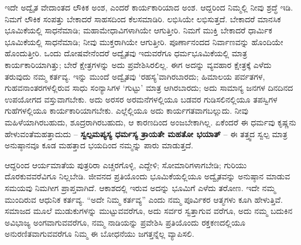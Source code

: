 ಇದೇ ಅದ್ವೈತ ವೇದಾಂತದ ಲೌಕಿಕ ಅಂಶ, ಎಂದರೆ ಕಾರ್ಯಕಾರಿಯಾದ ಅಂಶ. ಆದ್ದರಿಂದ ನಿಮ್ಮಲ್ಲಿ ನೀವು ಶ್ರದ್ಧೆ ಇಡಿ. ನಿಮಗೆ ಲೌಕಿಕ ಸಂಪತ್ತು ಬೇಕಾದರೆ ಸಾಹಸದಿಂದ ಕೆಲಸಮಾಡಿರಿ. ಲಭಿಸಿಯೇ ಲಭಿಸುತ್ತದೆ. ಬೇಕಾದರೆ ಮಾನಸಿಕ ಭೂಮಿಕೆಯಲ್ಲಿ ಸಾಧನೆಮಾಡಿ; ಮಹಾಮೇಧಾವಿಗಳಾಗಿಯೇ ಆಗುತ್ತೀರಿ. ನಿಮಗೆ ಮುಕ್ತಿ ಬೇಕಾದರೆ ಧಾರ್ಮಿಕ ಭೂಮಿಕೆಯಲ್ಲಿ ಸಾಧನೆಮಾಡಿ; ನೀವು ಮುಕ್ತರಾಗಿಯೇ ಆಗುತ್ತೀರಿ. ಪೂರ್ಣಾನಂದದ ನಿರ್ವಾಣವನ್ನು ಹೊಂದಿಯೇ ಹೊಂದುತ್ತೀರಿ. ಒಂದು ದೋಷವೇನೆಂದರೆ ಅದ್ವೈತವು ಇದುವರೆಗೂ ಧರ್ಮಭೂಮಿಕೆಯಲ್ಲಿ ಮಾತ್ರ ಕಾರ್ಯಕಾರಿಯಾಗಿತ್ತು; ಬೇರೆ ಕ್ಷೇತ್ರಗಳನ್ನು ಅದು ಪ್ರವೇಶಿಸಿರಲಿಲ್ಲ. ಈಗ ಅದನ್ನು ವ್ಯವಹಾರ ಕ್ಷೇತ್ರಕ್ಕೆ ಎಳೆದು ತರುವುದು ನಮ್ಮ ಕರ್ತವ್ಯ. ಇನ್ನು ಮುಂದೆ ಅದ್ವೈತವು ‘ರಹಸ್ಯ’ವಾಗಿರಬಾರದು; ಹಿಮಾಲಯ ಪರ್ವತಗಳ, ಗುಹವನಾಂತರಗಳಲ್ಲಿರುವ ಸಾಧು ಸಂನ್ಯಾಸಿಗಳ ‘ಗುಟ್ಟು’ ಮಾತ್ರ ಆಗಿರಬಾರದು; ಅದು ಸಾಮಾನ್ಯ ಜನಗಳ ದಿನದಿನದ ಉಪಯೋಗದ ವಸ್ತುವಾಗಬೇಕು. ಅದು ಅರಸರ ಅರಮನೆಗಳಲ್ಲಿಯೂ ಬಡವರ ಗುಡಿಸಲಿನಲ್ಲಿಯೂ ತಪಸ್ವಿಗಳ ಗುಹೆಗಳಲ್ಲಿಯೂ ಕಾರ್ಯಕಾರಿಯಾಗಬೇಕು. ಎಲ್ಲೆಲ್ಲಿಯೂ ಅದು ಕಾರ್ಯಗತವಾಗಬಲ್ಲುದು. ನೀವು ಮಹಿಳೆಯಾಗಿರಬಹುದು, ಶೂದ್ರರಾಗಿರಬಹುದು, ಆ ಕಾರಣದಿಂದ ಅಂಜಬೇಕಾಗಿಲ್ಲ. ಏಕೆಂದರೆ ಈ ಧರ್ಮವು ಕೃಷ್ಣನು ಹೇಳುವಂತೆ\break ಮಹತ್ತಾದುದು – \textbf{ಸ್ವಲ್ಪಮಪ್ಯಸ್ಯ ಧರ್ಮಸ್ಯ ತ್ರಾಯತೇ ಮಹತೋ ಭಯಾತ್​} – ಈ ತತ್ತ್ವದ ಸ್ವಲ್ಪ ಮಾತ್ರ ಅನುಷ್ಠಾನವೂ ಕೂಡ ಮಹತ್ತಾದ ಭಯದಿಂದ ನಮ್ಮನ್ನು ಪಾರು ಮಾಡುತ್ತದೆ. 

\vskip 2pt

ಆದ್ದರಿಂದ ಆರ್ಯಮಾತೆಯ ಪುತ್ರರಿರಾ ಎಚ್ಚರಗೊಳ್ಳಿ, ಎದ್ದೇಳಿ; ಸೋಮಾರಿಗಳಾಗಬೇಡಿ; ಗುರಿಯು ದೊರಕುವವರೆವಿಗೂ ನಿಲ್ಲಬೇಡಿ. ಜೀವನದ ಪ್ರತಿಯೊಂದು ಭೂಮಿಕೆಯಲ್ಲಿಯೂ ಅದ್ವೈತವನ್ನು ಅನುಷ್ಠಾನ ಮಾಡುವ ಸಮಯವು ನಿಮಗೀಗ ಪ್ರಾಪ್ತವಾಗಿದೆ. ಆಕಾಶದಲ್ಲಿ ಇರುವ ಅದನ್ನು ಭೂಮಿಗೆ ಎಳೆದು ತರೋಣ. ಇದೇ ನಮ್ಮ ಮುಂದಿರುವ ಆಧುನಿಕ ಕರ್ತವ್ಯ. “ಅದೇ ನಿಮ್ಮ ಕರ್ತವ್ಯ” ಎಂದು ನಮ್ಮ ಪೂರ್ವಿಕರ ಆತ್ಮಗಳು ಕೂಗಿ ಹೇಳುತ್ತಿವೆ. ಸಮಾಜದ ಮೂಲೆ ಮುಡುಕುಗಳನ್ನು ಮುಟ್ಟುವವರೆಗೂ, ಅದು ಸರ್ವರ ಸ್ವತ್ತಾಗುವ ವರೆಗೂ, ಅದು ನಮ್ಮ ಬದುಕಿನ ಅವಿಭಾಜ್ಯ ಅಂಗವಾಗುವವರೆಗೂ, ನಮ್ಮ ನಾಡಿಯನ್ನು ಪ್ರವೇಶಿಸಿ ಪ್ರತಿಯೊಂದು ರಕ್ತಕಣದಲ್ಲಿಯೂ ಅನುರಣಿತವಾಗುವವರೆಗೂ ನಿಮ್ಮ ಈ ಬೋಧನೆಯು ಜಗತ್ತನ್ನೆಲ್ಲ ವ್ಯಾಪಿಸಲಿ. 

\vskip 2pt


